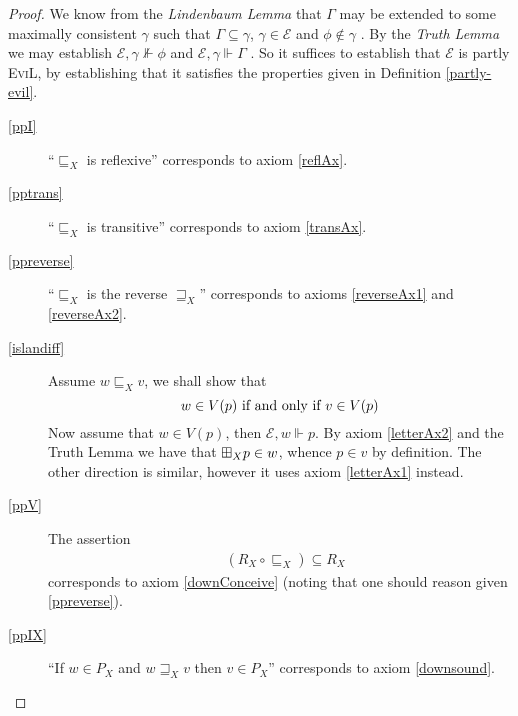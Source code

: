 \begin{proof}
We know from the \emph{Lindenbaum Lemma} that $\Gamma$ may be extended
to some maximally consistent $\gamma$ such that $\Gamma \subseteq
\gamma$, $\gamma \in \mathcal{E}$ and $\phi \nin
\gamma$ \cite[Lemma 4.17,
pg. 199]{blackburn_modal_2001}.  By the \emph{Truth Lemma} we may establish
$\mathscr{E}, \gamma \nVdash \phi$ and $\mathscr{E}, \gamma \Vdash \Gamma$ \cite[Lemma 4.21,
pgs. 201]{blackburn_modal_2001}.  So it suffices to establish
that $\mathscr{E}$ is partly \textsc{EviL}, by establishing that it
satisfies the properties given in Definition \ref{partly-evil}.

  \begin{description}
    \item[\ref{ppI}] ``$\sqsubseteq_X$ is reflexive''
      corresponds to axiom \eqref{reflAx}.
    \item[\ref{pptrans}] ``$\sqsubseteq_X$ is transitive''
      corresponds to axiom \eqref{transAx}.
    \item[\ref{ppreverse}] ``$\sqsubseteq_X$ is the
      reverse $\sqsupseteq_X$'' corresponds to axioms \eqref{reverseAx1} and
      \eqref{reverseAx2}.
    \item[\ref{islandiff}] Assume $w \sqsubseteq_X v$, we shall show
      that 
$$w \in V (p)\textup{ if and only if }v \in V (p)$$
     Now assume that $w \in V(p)$, then $\mathscr{E}, w \Vdash p$.
      By axiom \eqref{letterAx2} and the Truth Lemma we have that $\boxplus_X
      p \in w$, whence $p \in v$ by definition.  The other direction
      is similar, however it uses axiom \eqref{letterAx1} instead.
    \item[\ref{ppV}] 
The assertion
\begin{eqnarray*}
& (R_X \circ \sqsubseteq_X) \subseteq
    R_X 
\end{eqnarray*}
corresponds to axiom \eqref{downConceive} 
(noting that one should reason given \ref{ppreverse}). 

    \item[\ref{ppIX}] ``If $w \in P_X$ and $w \sqsupseteq_X
      v$ then $v \in P_X$'' corresponds to axiom \eqref{downsound}.


\end{description}
\end{proof}
